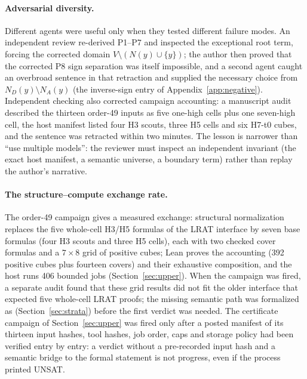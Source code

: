 \documentclass{anvil-paper}
\theoremstyle{definition}
\begin{document}
\paragraph{Adversarial diversity.} Different agents were useful only when they tested different failure modes. An independent review re-derived P1--P7 and inspected the exceptional root term, forcing the corrected domain $V\setminus(N(y)\cup\{y\})$; the author then proved that the corrected P8 sign separation was itself impossible, and a second agent caught an overbroad sentence in that retraction and supplied the necessary choice from $N_D(y)\setminus N_A(y)$ (the inverse-sign entry of Appendix~\ref{app:negative}). Independent checking also corrected campaign accounting: a manuscript audit described the thirteen order-49 inputs as five one-high cells plus one seven-high cell, the host manifest listed four H3 scouts, three H5 cells and six H7-t0 cubes, and the sentence was retracted within two minutes. The lesson is narrower than ``use multiple models'': the reviewer must inspect an independent invariant (the exact host manifest, a semantic universe, a boundary term) rather than replay the author's narrative.

\paragraph{The structure--compute exchange rate.} The order-49 campaign gives a measured exchange: structural normalization replaces the five whole-cell H3/H5 formulas of the LRAT interface by seven base formulas (four H3 scouts and three H5 cells), each with two checked cover formulas and a $7\times 8$ grid of positive cubes; Lean proves the accounting (392 positive cubes plus fourteen covers) and their exhaustive composition, and the host runs 406 bounded jobs (Section~\ref{sec:upper}). When the campaign was fired, a separate audit found that these grid results did not fit the older interface that expected five whole-cell LRAT proofs; the missing semantic path was formalized as  (Section~\ref{sec:strata}) before the first verdict was needed. The certificate campaign of Section~\ref{sec:upper} was fired only after a posted manifest of its thirteen input hashes, tool hashes, job order, caps and storage policy had been verified entry by entry: a verdict without a pre-recorded input hash and a semantic bridge to the formal statement is not progress, even if the process printed UNSAT.
\end{document}
